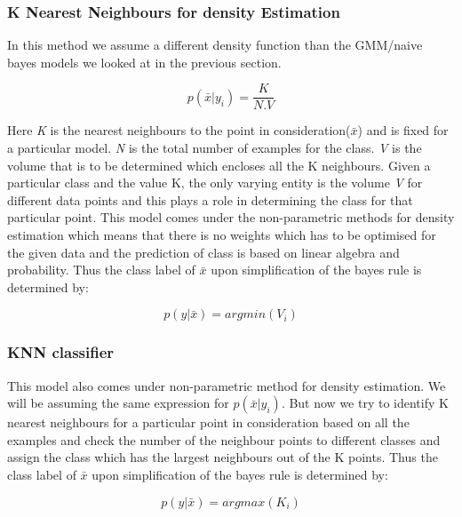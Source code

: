  \subsubsection*{K Nearest Neighbours for density Estimation}
 In this method we assume a different density function than the GMM/naive bayes models we looked at in the previous section. 
 
 \[
 p(\bar{x}|y_i) = \frac{K}{N.V}
 \]
 
 Here \textit{K} is the nearest neighbours to the point in consideration($\bar{x}$) and is fixed for a particular model. \textit{N} is the total number of examples for the class. \textit{V} is the volume that is to be determined which encloses all the K neighbours. Given a particular class and the value K, the only varying entity is the volume \textit{V} for different data points and this plays a role in determining the class for that particular point. This model comes under the non-parametric methods for density estimation which means that there is no weights which has to be optimised for the given data and the prediction of class is based on linear algebra and probability. Thus the class label of $\bar{x}$ upon simplification of the bayes rule is determined by:
 
  \[
 p(y|\bar{x}) = argmin(V_i)
 \]
 
 \subsubsection*{KNN classifier}
 
 This model also comes under non-parametric method for density estimation. We will be assuming the same expression for $p(\bar{x}|y_i)$. But now we try to identify K nearest neighbours for a particular point in consideration based on all the examples and check the number of the neighbour points to different classes and assign the class which has the largest neighbours out of the K points. Thus the class label of $\bar{x}$ upon simplification of the bayes rule is determined by:
 
   \[
 p(y|\bar{x}) = argmax(K_i)
 \]

